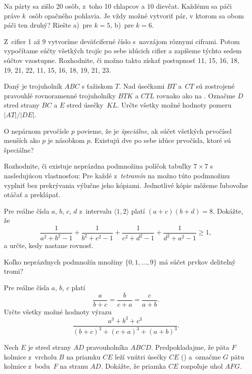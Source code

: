 ﻿{%
Na párty sa zišlo 20 osôb, z~toho 10 chlapcov a 10 dievčat. Každému sa páči práve $k$~osôb opačného pohlavia. Je vždy možné vytvoriť pár, v ktorom sa obom páči ten druhý? Riešte a)~pre $k=5$, b)~pre $k=6$.
}

{%
Z~cifier 1 až 9 vytvoríme deväťciferné číslo s~navzájom rôznymi ciframi. Potom vypočítame súčty všetkých trojíc po sebe idúcich cifier a zapíšeme týchto sedem súčtov vzostupne. Rozhodnite, či možno takto získať postupnosť
 11, 15, 16, 18, 19, 21, 22,
 11, 15, 16, 18, 19, 21, 23.
}

{%
Daný je trojuholník $ABC$ s ťažiskom $T$. Nad úsečkami $BT$ a~$CT$ sú zostrojené pravouhlé rovnoramenné trojuholníky $BTK$ a $CTL$ rovnako ako na \obr{}. Označme $D$ stred strany $BC$ a $E$ stred úsečky~$KL$. Určte všetky možné hodnoty pomeru $|AT|/|DE|$.
%
}

{%
O nepárnom prvočísle $p$ povieme, že je \emph{špeciálne}, ak súčet všetkých prvočísel menších ako $p$ je násobkom $p$. Existujú dve po sebe idúce prvočísla, ktoré sú špeciálne?
}

{%
Rozhodnite, či existuje neprázdna podmnožina políčok tabuľky $7\times 7$ s nasledujúcou vlastnosťou: Pre každé z~\emph{tetramín} na \obr{}
%
možno túto podmnožinu vyplniť bez prekrývania výlučne jeho kópiami.
Jednotlivé kópie môžeme ľubovoľne otáčať a preklápať.}

{%
Pre reálne čísla $a$, $b$, $c$, $d$ z~intervalu $\langle1,2\rangle$ platí $(a + c)(b + d) = 8$. Dokážte, že
$$\frac{1}{a^2+b^2-1} + \frac{1}{b^2+c^2-1} + \frac{1}{c^2+d^2- 1} + \frac{1}{d^2+a^2-1} \geq 1,$$
a určte, kedy nastane rovnosť.}

{%
Koľko neprázdnych podmnožín množiny $\{0,1,\ldots,9\}$ má súčet prvkov deliteľný tromi?}

{%
Pre reálne čísla $a$, $b$, $c$ platí
$$\frac{a}{b+c} = \frac{b}{c+a} = \frac{c}{a+b}.$$
Určte všetky možné hodnoty výrazu
$$\frac{a^3+b^3+c^3}{(b+c)^3 + (c+a)^3 + (a+b)^3}.
$$
}

{%
Nech $E$ je stred strany $AD$ pravouholníka $ABCD$. Predpokladajme, že päta $F$ kolmice z~vrcholu $B$ na priamku $CE$ leží vnútri úsečky $CE$ (\obr) a~označme $G$ pätu kolmice z~bodu~$F$ na stranu $AD$. Dokážte, že priamka $CE$ rozpoľuje uhol $AFG$.
%
}


